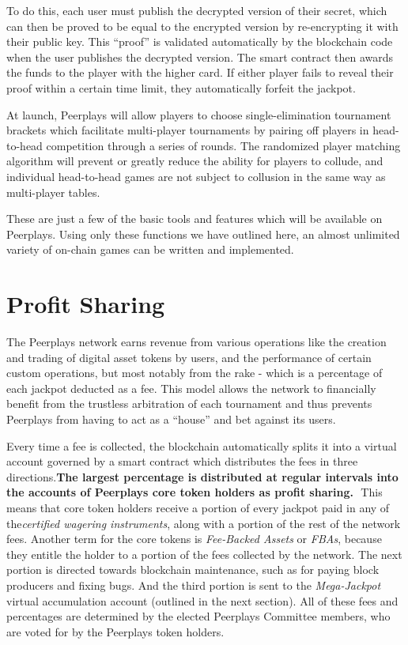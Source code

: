 \documentclass[a4paper,titlepage,final]{article}
\begin{document}
To do this, each user must publish the decrypted version of their secret, which can then be proved to be equal to the encrypted version by re-encrypting it with their public key. This “proof” is validated automatically by the blockchain code when the user publishes the decrypted version. The smart contract then awards the funds to the player with the higher card. If either player fails to reveal their proof within a certain time limit, they automatically forfeit the jackpot. 

At launch, Peerplays will allow players to choose single-elimination tournament brackets which facilitate multi-player tournaments by pairing off players in head-to-head competition through a series of rounds. The randomized player matching algorithm will prevent or greatly reduce the ability for players to collude, and individual head-to-head games are not subject to collusion in the same way as multi-player tables. 

These are just a few of the basic tools and features which will be available on Peerplays. Using only these functions we have outlined here, an almost unlimited variety of on-chain games can be written and implemented.

\section{Profit Sharing}

The Peerplays network earns revenue from various operations like the creation and trading of digital asset tokens by users, and the performance of certain custom operations, but most notably from the rake - which is a percentage of each jackpot deducted as a fee. This model allows the network to financially benefit from the trustless arbitration of each tournament and thus prevents Peerplays from having to act as a “house” and bet against its users. 

Every time a fee is collected, the blockchain automatically splits it into a virtual account governed by a smart contract which distributes the fees in three directions.\textbf{​The largest percentage is distributed at regular intervals into the accounts of Peerplays core token holders as profit sharing.} ​ This means that core token holders receive a portion of every jackpot paid in any of the \textit{​certified wagering instruments}, along with a portion of the rest of the network fees. Another term for the core tokens is \textit{Fee-Backed Assets} or \textit{FBAs}, because they​ entitle the holder to a portion of the fees collected by the network.\cite{8}​ The next portion is directed towards blockchain maintenance, such as for paying block producers and fixing bugs. And the third portion is sent to the \textit{Mega-Jackpot} virtual accumulation account (outlined in the next section). All of these fees and percentages are determined by the elected Peerplays Committee members, who are voted for by the Peerplays token holders.
\end{document}
